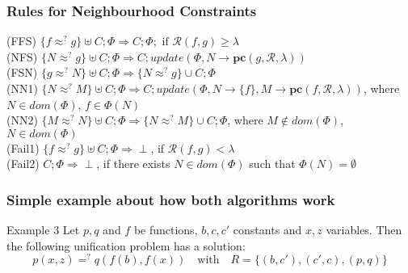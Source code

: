 		
		\begin{frame}[fragile=singleslide]
	\frametitle{Rules for Neighbourhood Constraints}
		\textcolor[rgb]{0.55,0,0}{(FFS)} $\{f \approx^? g\} \uplus C; \Phi \Rightarrow  C; \Phi; \text{ if } \mathcal{R}(f,g)\geq \lambda$ \\
		\vspace{0.3cm}
		\textcolor[rgb]{0.55,0,0}{(NFS)} $\{N \approx^? g\} \uplus C; \Phi \Rightarrow  C; update(\Phi,N\rightarrow \textbf{pc}(g,\mathcal{R},\lambda))$  \\
		\vspace{0.3cm}
		\textcolor[rgb]{0.55,0,0}{(FSN)} $\{g \approx^? N\} \uplus C; \Phi \Rightarrow  \{N \approx^? g\} \cup C;\Phi$  \\
		\vspace{0.3cm}
		\textcolor[rgb]{0.55,0,0}{(NN1)} $\{N \approx^? M\} \uplus C; \Phi \Rightarrow  C; update(\Phi,N\rightarrow \{f\}, M\rightarrow \textbf{pc}(f,\mathcal{R},\lambda))$, where $N \in dom(\Phi )$, $f\in \Phi(N)$ \\
		\vspace{0.3cm}
		\textcolor[rgb]{0.55,0,0}{(NN2)} $\{M \approx^? N\} \uplus C; \Phi \Rightarrow  \{N \approx^? M\} \cup C;\Phi$, where $M \notin dom(\Phi )$, $N\in dom(\Phi)$ \\
		\vspace{0.3cm}
		\textcolor[rgb]{0.55,0,0}{(Fail1)} $\{f \approx^? g\} \uplus C; \Phi \Rightarrow  \perp$, if $\mathcal{R}(f,g) < \lambda$ \\
		\vspace{0.3cm}
		\textcolor[rgb]{0.55,0,0}{(Fail2)} $C; \Phi \Rightarrow  \perp$, if there exists $N \in dom(\Phi )$ such that $\Phi (N)=\emptyset$ \\
		\vspace{0.3cm}
	
  \end{frame}	


	\begin{frame}[fragile=singleslide]
	\frametitle{Simple example about how both algorithms work}
	\begin{exampleblock}{Example 3}
	Let $p,q$ and $f$ be functions, $b,c,c'$ constants and $x,z$ variables. Then the following unification problem has a solution:\\
	\[p(x,z) =^? q(f(b),f(x)) \quad \text{with}\quad R=\{(b,c'),(c',c),(p,q)\}\]\\
	\end{exampleblock}
	\end{frame}
	
